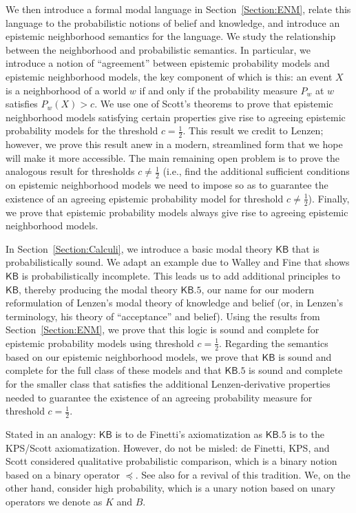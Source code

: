 \documentclass[12pt]{article}
\theoremstyle{definition}
\newcommand{\KB}{{\mathsf{KB}}}                 %
\newcommand{\KBeq}{{\mathsf{KB.5}}}             %
\begin{document}
We then introduce a formal modal language in
Section~\ref{Section:ENM}, relate this language to the probabilistic
notions of belief and knowledge, and introduce an epistemic
neighborhood semantics for the language.  We study the relationship
between the neighborhood and probabilistic semantics. In particular,
we introduce a notion of ``agreement'' between epistemic probability
models and epistemic neighborhood models, the key component of which
is this: an event $X$ is a neighborhood of a world $w$ if and only if
the probability measure $P_w$ at $w$ satisfies $P_w(X)>c$.  We use one
of Scott's theorems to prove that epistemic neighborhood models
satisfying certain properties give rise to agreeing epistemic
probability models for the threshold $c=\frac 12$.  This result we
credit to Lenzen; however, we prove this result anew in a modern,
streamlined form that we hope will make it more accessible.  The main
remaining open problem is to prove the analogous result for thresholds
$c\neq\frac 12$ (i.e., find the additional sufficient conditions on
epistemic neighborhood models we need to impose so as to guarantee the
existence of an agreeing epistemic probability model for threshold
$c\neq\frac 12$).  Finally, we prove that epistemic probability models
always give rise to agreeing epistemic neighborhood models.

In Section~\ref{Section:Calculi}, we introduce a basic modal theory
$\KB$ that is probabilistically sound.  We adapt an example due to
Walley and Fine \cite{WalleyFine1979:vomacp} that shows $\KB$ is
probabilistically incomplete.  This leads us to add additional
principles to $\KB$, thereby producing the modal theory $\KBeq$, our
name for our modern reformulation of Lenzen's modal theory of
knowledge and belief (or, in Lenzen's terminology, his theory of
``acceptance'' and belief).  Using the results from
Section~\ref{Section:ENM}, we prove that this logic is sound and
complete for epistemic probability models using threshold
$c=\frac 12$. Regarding the semantics based on our epistemic
neighborhood models, we prove that $\KB$ is sound and complete for the
full class of these models and that $\KBeq$ is sound and complete for
the smaller class that satisfies the additional Lenzen-derivative
properties needed to guarantee the existence of an agreeing
probability measure for threshold $c=\frac 12$.

Stated in an analogy: $\KB$ is to de Finetti's axiomatization as
$\KBeq$ is to the KPS/Scott axiomatization.  However, do not be
misled: de Finetti, KPS, and Scott considered qualitative
probabilistic comparison, which is a binary notion based on a binary
operator $\preceq$.  See also \cite{HollidayIcard2013:msaqs} for a
revival of this tradition. We, on the other hand, consider high
probability, which is a unary notion based on unary operators we
denote as $K$ and $B$.
\end{document}
